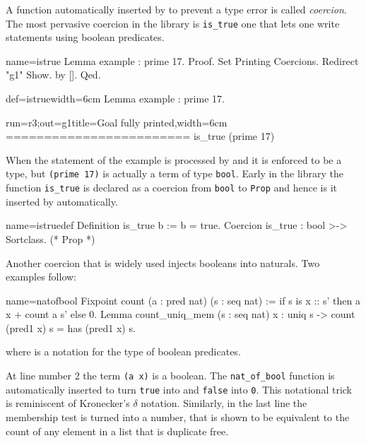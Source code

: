 A function automatically inserted by \Coq{} to prevent a type
error is called \emph{coercion}.
The most pervasive coercion in the \mcbMC{} library is
\lstinline/is_true/ one that lets one write statements using boolean
predicates.

\begin{coqdef}{name=istrue}
Lemma example : prime 17.
Proof.
Set Printing Coercions. Redirect "g1" Show.
by [].
Qed.
\end{coqdef}
\begin{coq}{def=istrue}{width=6cm}
Lemma example : prime 17.
$~$
$~$
\end{coq}
\begin{coqout}{run=r3;out=g1}{title=Goal fully printed,width=6cm}
========================
is_true (prime 17)
\end{coqout}

When the statement of the example is processed by \Coq{}
and it is enforced to be a type, but \lstinline/(prime 17)/ is actually
a term of type \lstinline/bool/.  Early in the library the
function \lstinline/is_true/ is declared as a coercion from
\lstinline/bool/ to \lstinline/Prop/ and hence is it inserted
by \Coq{} automatically.

\begin{coq}{name=istruedef}{}
Definition is_true b := b = true.
Coercion is_true : bool >-> Sortclass. (* Prop *)
\end{coq}

Another coercion that is widely used injects booleans into naturals.
Two examples follow:

\begin{coq}{name=natofbool}{}
Fixpoint count (a : pred nat) (s : seq nat) :=
  if s is x :: s' then a x + count a s' else 0.
Lemma count_uniq_mem (s : seq nat) x :
  uniq s -> count (pred1 x) s = has (pred1 x) s.
\end{coq}
where  is a notation for the type   of boolean
predicates.


At line number 2 the term \lstinline/(a x)/ is a boolean.  The
\lstinline/nat_of_bool/ function is automatically inserted to turn
\lstinline/true/ into  and \lstinline/false/ into \lstinline/0/.
This notational trick is reminiscent of Kronecker's $\delta$ notation.
Similarly, in the last line the membership test is turned into
a number, that is shown to be equivalent to the count of any
element in a list that is duplicate free.

